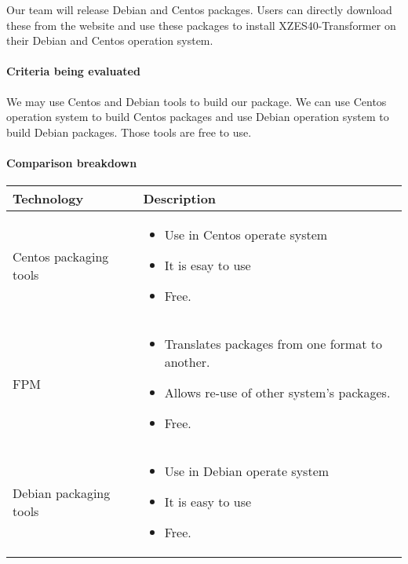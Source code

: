 Our team will release Debian and Centos packages.
Users can directly download these from the website and use these packages to install XZES40-Transformer on their Debian and Centos operation system.

\paragraph{Criteria being evaluated}

We may use Centos and Debian tools to build our package.
We can use Centos operation system to build Centos packages and use Debian operation system to build Debian packages.
Those tools are free to use.

\paragraph{Comparison breakdown}

\begin{center}
  \begin{tabular}{ | l | p{10cm} |}
    \hline
    Technology & Description  \\ \hline

    Centos packaging tools \cite{centos-tool} &
    \begin{itemize}
      \item Use in Centos operate system 
      \item It is esay to use
      \item Free.
    \end{itemize} \\ \hline

    FPM \cite{fpm-home} &
    \begin{itemize}
      \item Translates packages from one format to another.
      \item Allows re-use of other system's packages.
      \item Free.
    \end{itemize} \\ \hline

    Debian packaging tools \cite{debian-tool} &
    \begin{itemize}
      \item Use in Debian operate system
      \item It is easy to use
      \item Free.
    \end{itemize} \\ \hline
  \end{tabular}
\end{center}

